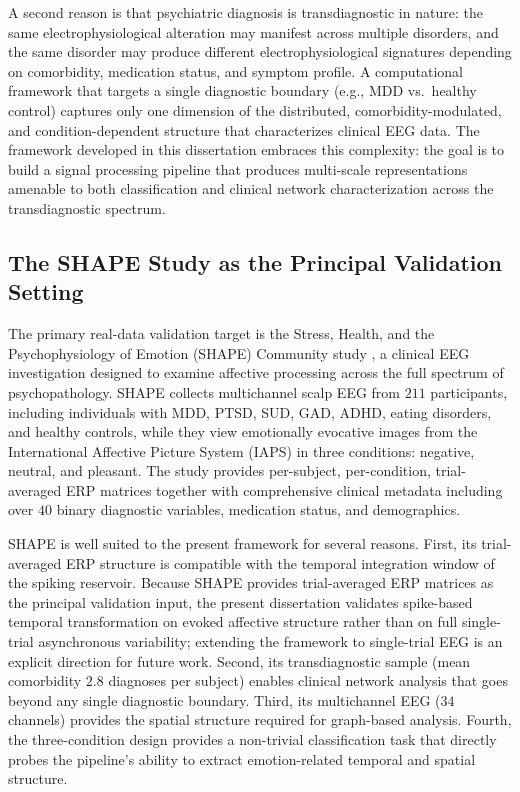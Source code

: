A second reason is that psychiatric diagnosis is transdiagnostic in nature: the same electrophysiological alteration may manifest across multiple disorders, and the same disorder may produce different electrophysiological signatures depending on comorbidity, medication status, and symptom profile. A computational framework that targets a single diagnostic boundary (e.g., MDD vs.\ healthy control) captures only one dimension of the distributed, comorbidity-modulated, and condition-dependent structure that characterizes clinical EEG data. The framework developed in this dissertation embraces this complexity: the goal is to build a signal processing pipeline that produces multi-scale representations amenable to both classification and clinical network characterization across the transdiagnostic spectrum.

\subsection{The SHAPE Study as the Principal Validation Setting}

The primary real-data validation target is the Stress, Health, and the Psychophysiology of Emotion (SHAPE) Community study \cite{noauthor_shape_2018}, a clinical EEG investigation designed to examine affective processing across the full spectrum of psychopathology. SHAPE collects multichannel scalp EEG from $211$ participants, including individuals with MDD, PTSD, SUD, GAD, ADHD, eating disorders, and healthy controls, while they view emotionally evocative images from the International Affective Picture System (IAPS) \cite{lang_iaps_2008} in three conditions: negative, neutral, and pleasant. The study provides per-subject, per-condition, trial-averaged ERP matrices together with comprehensive clinical metadata including over $40$ binary diagnostic variables, medication status, and demographics.

SHAPE is well suited to the present framework for several reasons. First, its trial-averaged ERP structure is compatible with the temporal integration window of the spiking reservoir. Because SHAPE provides trial-averaged ERP matrices as the principal validation input, the present dissertation validates spike-based temporal transformation on evoked affective structure rather than on full single-trial asynchronous variability; extending the framework to single-trial EEG is an explicit direction for future work. Second, its transdiagnostic sample (mean comorbidity $2.8$ diagnoses per subject) enables clinical network analysis that goes beyond any single diagnostic boundary. Third, its multichannel EEG ($34$ channels) provides the spatial structure required for graph-based analysis. Fourth, the three-condition design provides a non-trivial classification task that directly probes the pipeline's ability to extract emotion-related temporal and spatial structure.

